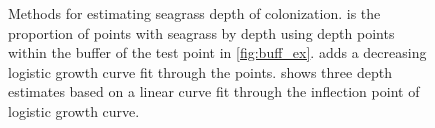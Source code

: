 \documentclass[letterpaper,12pt]{article}\usepackage[]{graphicx}\usepackage[]{color}
\begin{document}
\begin{figure}
\centering
{}


\caption{Methods for estimating seagrass depth of colonization.  is the proportion of points with seagrass by depth using depth points within the buffer of the test point in \cref{fig:buff_ex}.   adds a decreasing logistic growth curve fit through the points.   shows three depth estimates based on a linear curve fit through the inflection point of logistic growth curve.}
\label{fig:est_ex}
\end{figure}
\end{document}

